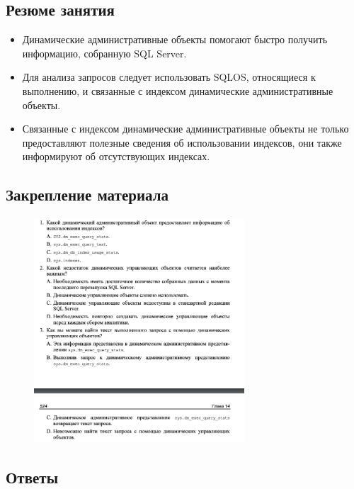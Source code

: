 \subsection*{Резюме занятия}
\begin{itemize}
	\item Динамические административные объекты помогают быстро получить информацию, собранную SQL Server. 
	\item Для анализа запросов следует использовать SQLOS, относящиеся к выполнению, и связанные с индексом динамические административные объекты. 
	\item Связанные с индексом динамические административные объекты не только предоставляют полезные сведения об использовании индексов, они также информируют об отсутствующих индексах. 
\end{itemize}


\subsection*{Закрепление материала}

\begin{figure}[h!]
	\begin{center}
		\includegraphics[width=0.7\textwidth]{img/zakrep42.png}
	\end{center}
	\captionsetup{justification=centering}
\end{figure}
\clearpage

\subsection*{Ответы}


